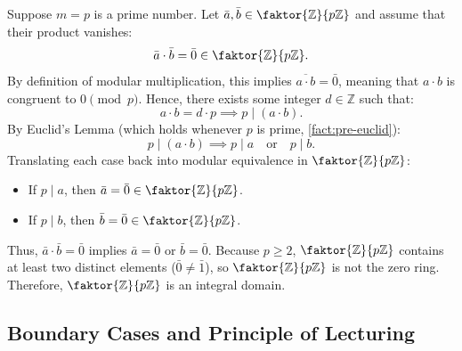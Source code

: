 \begin{proofWrapper}
\begin{content}
Suppose $m = p$ is a prime number. Let $\bar{a}, \bar{b} \in \faktor{\mathbb{Z}}{p\mathbb{Z}}$ and assume that their product vanishes:
\begin{equation}\label{eq:prime-prod-zero}
\bar{a} \cdot \bar{b} = \bar{0} \in \faktor{\mathbb{Z}}{p\mathbb{Z}}.
\end{equation}
By definition of modular multiplication, this implies $\overline{a \cdot b} = \bar{0}$, meaning that $a \cdot b$ is congruent to $0 \pmod p$. Hence, there exists some integer $d \in \mathbb{Z}$ such that:
\begin{equation}\label{eq:divisible-by-p}
a \cdot b = d \cdot p \implies p \mid (a \cdot b).
\end{equation}
By Euclid's Lemma (which holds whenever $p$ is prime, \cref{fact:pre-euclid}):
\begin{equation}\label{eq:euclids-lemma}
p \mid (a \cdot b) \implies p \mid a \quad \text{or} \quad p \mid b.
\end{equation}
Translating each case back into modular equivalence in $\faktor{\mathbb{Z}}{p\mathbb{Z}}$:
\begin{itemize}
    \item If $p \mid a$, then $\bar{a} = \bar{0} \in \faktor{\mathbb{Z}}{p\mathbb{Z}}$.
    \item If $p \mid b$, then $\bar{b} = \bar{0} \in \faktor{\mathbb{Z}}{p\mathbb{Z}}$.
\end{itemize}
Thus, $\bar{a} \cdot \bar{b} = \bar{0}$ implies $\bar{a} = \bar{0}$ or $\bar{b} = \bar{0}$. Because $p \ge 2$, $\faktor{\mathbb{Z}}{p\mathbb{Z}}$ contains at least two distinct elements ($\bar{0} \neq \bar{1}$), so $\faktor{\mathbb{Z}}{p\mathbb{Z}}$ is not the zero ring. Therefore, $\faktor{\mathbb{Z}}{p\mathbb{Z}}$ is an integral domain.
\end{content}

\end{proofWrapper}

\subsection{Boundary Cases and Principle of Lecturing}

